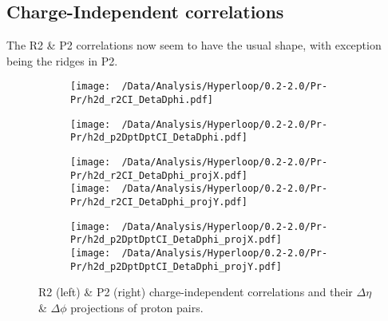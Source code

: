\documentclass[12pt,a4paper,twoside]{report}
\begin{document}
\subsection{Charge-Independent correlations}
The R2 \& P2 correlations now seem to have the usual shape, with exception being the ridges in P2.
\begin{figure}[H]
	\begin{subfigure}{0.49\linewidth}
		\texttt{[image: ~/Data/Analysis/Hyperloop/0.2-2.0/Pr-Pr/h2d\_r2CI\_DetaDphi.pdf]}\\
	\end{subfigure}
	\begin{subfigure}{0.49\linewidth}
		\texttt{[image: ~/Data/Analysis/Hyperloop/0.2-2.0/Pr-Pr/h2d\_p2DptDptCI\_DetaDphi.pdf]}\\
	\end{subfigure}
\end{figure}
\begin{figure}[H]
	\ContinuedFloat
	\begin{subfigure}{0.49\linewidth}
		\texttt{[image: ~/Data/Analysis/Hyperloop/0.2-2.0/Pr-Pr/h2d\_r2CI\_DetaDphi\_projX.pdf]}\\
		\texttt{[image: ~/Data/Analysis/Hyperloop/0.2-2.0/Pr-Pr/h2d\_r2CI\_DetaDphi\_projY.pdf]}\\
	\end{subfigure}
	\begin{subfigure}{0.49\linewidth}
		\texttt{[image: ~/Data/Analysis/Hyperloop/0.2-2.0/Pr-Pr/h2d\_p2DptDptCI\_DetaDphi\_projX.pdf]}\\
		\texttt{[image: ~/Data/Analysis/Hyperloop/0.2-2.0/Pr-Pr/h2d\_p2DptDptCI\_DetaDphi\_projY.pdf]}\\
	\end{subfigure}
	\caption{R2 (left) \& P2 (right) charge-independent correlations and their $\Delta\eta$ \& $\Delta\phi$ projections of proton pairs.}
\end{figure}
\end{document}
